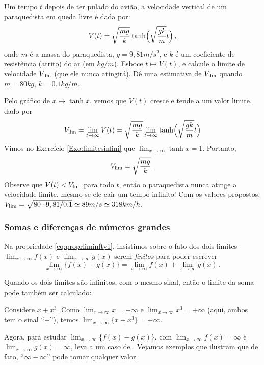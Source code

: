 \begin{exo}
Um tempo $t$ depois de ter pulado do avião, a velocidade
vertical de um paraquedista em queda livre é dada por:
$$V(t)=\sqrt{\frac{m g}{k}}\tanh\Bigl(\sqrt{\frac{gk}{m}}t\Bigr)\,,$$
onde $m$ é a massa do paraquedista, $g=9,81m/s^2$, e $k$ é um
coeficiente de resistência (atrito) do ar (em $kg/m$). Esboce
$t\mapsto V(t)$,
e calcule o limite de velocidade $V_{\rm lim}$ (que ele nunca
atingirá).
Dê uma estimativa de $V_{\rm lim}$ quando $m=80kg$, $k=0.1kg/m$.
\begin{sol}
Pelo gráfico de $x\mapsto \tanh x$, vemos que $V(t)$ cresce e tende a
um valor limite, dado por 
$$
V_{\rm lim}=\lim_{t\to\infty}V(t)=\sqrt{\frac{m
g}{k}}\lim_{t\to\infty}\tanh\Bigl(\sqrt{\frac{gk}{m}}t\Bigr)
$$
Vimos no Exercício \ref{Exo:limitesinfini} que
$\lim_{x\to\infty}\tanh x=1$. Portanto, 
$$V_{\rm lim}=\sqrt{\frac{m
g}{k}}\,.$$
Observe que $V(t)<V_{\rm lim}$ para todo $t$, então o paraquedista
nunca atinge a velocidade limite, mesmo se ele cair um tempo infinito!
Com os valores propostos,
$V_{\rm lim}=\sqrt{80\cdot 9,81/0.1}\simeq 89m/s\simeq 318km/h$.
\end{sol}
\end{exo}

\subsubsection{Somas e diferenças de números grandes}

Na propriedade \eqref{eq:proprliminfty1},
insistimos sobre o fato dos dois limites
$\lim_{x\to\infty}f(x)$  e $\lim_{x\to\infty}g(x)$ serem
\emph{finitos} para poder escrever
$$\lim_{x\to\infty}\{f(x)+g(x)\}=
\lim_{x\to\infty}f(x)+\lim_{x\to\infty}g(x)\,.$$

Quando os dois limites são infinitos, com o mesmo sinal, então o
limite da soma pode também ser calculado:

\begin{ex}
Considere $x+x^3$. Como $\lim_{x\to\infty}x=+\infty$ e
$\lim_{x\to\infty}x^3=+\infty$ (aqui, ambos tem o sinal ``$+$''), temos 
$\lim_{x\to\infty}\{x+x^3\}=+\infty$.
\end{ex}

Agora, para estudar $\lim_{x\to\infty}\{f(x)-g(x)\}$, com
$\lim_{x\to\infty}f(x)=\infty$ e
$\lim_{x\to\infty}g(x)=\infty$, 
leva a um caso de . Vejamos exemplos que ilustram que de
fato, ``$\infty-\infty$'' pode tomar qualquer valor.

